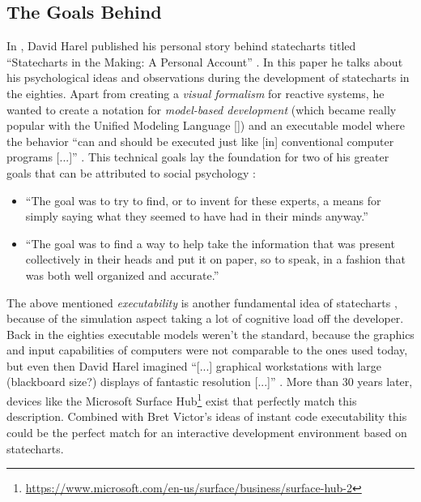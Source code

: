\subsection{The Goals Behind}
\label{sub:goals-behind-statecharts}
In \citeyear{harel_statecharts_2007}, David Harel published his personal story behind statecharts titled ``Statecharts in the Making: A Personal Account'' \autocite{harel_statecharts_2007}.
In this paper he talks about his psychological ideas and observations during the development of statecharts in the eighties.
Apart from creating a \emph{visual formalism} for reactive systems, he wanted to create a notation for \emph{model-based development} (which became really popular with the Unified Modeling Language [\textcite{cook_unified_2017}]) and an executable model where the behavior ``can and should be executed just like [in] conventional computer programs [...]'' \autocite[1]{harel_statecharts_2007}.
This technical goals lay the foundation for two of his greater goals that can be attributed to social psychology \autocite[3--4]{harel_statecharts_2007}:
\begin{itemize}
    \item ``The goal was to try to find, or to invent for these experts, a means for simply saying what they seemed to have had in their minds anyway.''
    \item ``The goal was to find a way to help take the information that was present collectively in their heads and put it on paper, so to speak, in a fashion that was both well organized and accurate.''
\end{itemize}

The above mentioned \emph{executability} is another fundamental idea of statecharts \autocite[7]{harel_modeling_1998}, because of the simulation aspect taking a lot of cognitive load off the developer.
Back in the eighties executable models weren't the standard, because the graphics and input capabilities of computers were not comparable to the ones used today, but even then David Harel imagined ``[...] graphical workstations with large (blackboard size?) displays of fantastic resolution [...]'' \autocite[272]{harel_statecharts:_1987}.
More than 30 years later, devices like the Microsoft Surface Hub\footnote{\url{https://www.microsoft.com/en-us/surface/business/surface-hub-2}} exist that perfectly match this description.
Combined with Bret Victor's ideas of instant code executability \autocite{victor_inventing_2012} this could be the perfect match for an interactive development environment based on statecharts.


